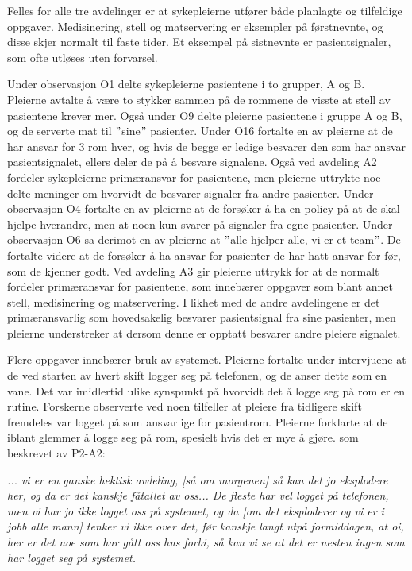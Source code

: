 \noindent
Felles for alle tre avdelinger er at sykepleierne utfører både planlagte og tilfeldige oppgaver. Medisinering, stell og matservering er eksempler på førstnevnte, og disse skjer normalt til faste tider. Et eksempel på sistnevnte er pasientsignaler, som ofte utløses uten forvarsel.  

\noindent
Under observasjon O1 delte sykepleierne pasientene i to grupper, A og B. Pleierne avtalte å være to stykker sammen på de rommene de visste at stell av pasientene krever mer. Også under O9 delte pleierne pasientene i gruppe A og B, og de serverte mat til $"$sine$"$ pasienter. Under O16 fortalte en av pleierne at de har ansvar for 3 rom hver, og hvis de begge er ledige besvarer den som har ansvar pasientsignalet, ellers deler de på å besvare signalene. Også ved avdeling A2 fordeler sykepleierne primæransvar for pasientene, men pleierne uttrykte noe delte meninger om hvorvidt de besvarer signaler fra andre pasienter. Under observasjon O4 fortalte en av pleierne at de forsøker å ha en policy på at de skal hjelpe hverandre, men at noen kun svarer på signaler fra egne pasienter. Under observasjon O6 sa derimot en av pleierne at $"$alle hjelper alle, vi er et team$"$. De fortalte videre at de forsøker å ha ansvar for pasienter de har hatt ansvar for før, som de kjenner godt. Ved avdeling A3 gir pleierne uttrykk for at de normalt fordeler primæransvar for pasientene, som innebærer oppgaver som blant annet stell, medisinering og matservering. I likhet med de andre avdelingene er det primæransvarlig som hovedsakelig besvarer pasientsignal fra sine pasienter, men pleierne understreker at dersom denne er opptatt besvarer andre pleiere signalet.

\noindent
Flere oppgaver innebærer bruk av systemet. Pleierne fortalte under intervjuene at de ved starten av hvert skift logger seg på telefonen, og de anser dette som en vane. Det var imidlertid ulike synspunkt på hvorvidt det å logge seg på rom er en rutine. Forskerne observerte ved noen tilfeller at pleiere fra tidligere skift fremdeles var logget på som ansvarlige for pasientrom. Pleierne forklarte at de iblant glemmer å logge seg på rom, spesielt hvis det er mye å gjøre. som beskrevet av P2-A2:

\noindent
\textit{... vi er en ganske hektisk avdeling, [så om morgenen] så kan det jo eksplodere her, og da er det kanskje fåtallet av oss... De fleste har vel logget på telefonen, men vi har jo ikke logget oss på systemet, og da [om det eksploderer og vi er i jobb alle mann] tenker vi ikke over det, før kanskje langt utpå formiddagen, at oi, her er det noe som har gått oss hus forbi, så kan vi se at det er nesten ingen som har logget seg på systemet.}

